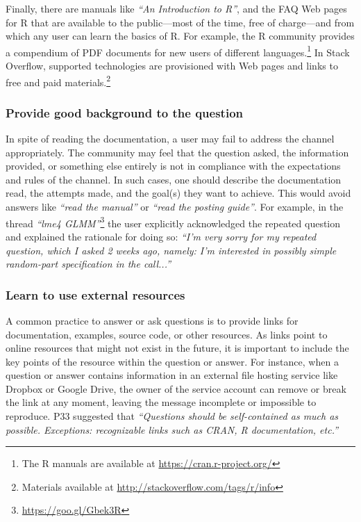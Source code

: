 \documentclass[smallextended]{svjour3}       %
\newcommand{\SO}{Stack Overflow\xspace}
\newcommand{\recc}{Provide good background to the question}
\newcommand{\recd}{Learn to use external resources}
\begin{document}
    Finally, there are manuals like \textit{``An Introduction to R''}, and the FAQ Web pages for R that are available to the public---most of the time, free of charge---and from which any user can learn the basics of R.
    For example, the R community provides a compendium of PDF documents for new users of different languages.\footnote{The R manuals are available at \url{https://cran.r-project.org/}}
    In \SO, supported technologies are provisioned with Web pages and links to free and paid materials.\footnote{Materials available at \url{http://stackoverflow.com/tags/r/info}}
    


\subsubsection{\recc}

    In spite of reading the documentation, a user may fail to address the channel appropriately.
    The community may feel that the question asked, the information provided, or something else entirely is not in compliance with the expectations and rules of the channel.
    In such cases, one should describe the documentation read, the attempts made, and the goal(s) they want to achieve.
    This would avoid answers like \textit{``read the manual''} or \textit{``read the posting guide''}.     For example, in the thread \textit{``lme4 GLMM''}\footnote{\url{https://goo.gl/Gbek3R}} the user explicitly acknowledged the repeated question and explained the rationale for doing so: \textit{``I'm very sorry for my repeated question, which I asked 2 weeks ago, namely: I'm interested in possibly simple random-part specification in the call...''}


\subsubsection{\recd}

    A common practice to answer or ask questions is to provide links for documentation, examples, source code, or other resources.
    As links point to online resources that might not exist in the future, it is important to include the key points of the resource within the question or answer.
    For instance, when a question or answer contains information in an external file hosting service like Dropbox or Google Drive, the owner of the service account can remove or break the link at any moment, leaving the message incomplete or impossible to reproduce.     P33 suggested that \textit{``Questions should be self-contained as much as possible. Exceptions: recognizable links such as CRAN, R documentation, etc.''}
\end{document}
